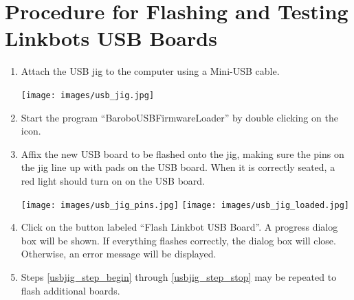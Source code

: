 \documentclass{article}
\begin{document}
\section{Procedure for Flashing and Testing Linkbots USB Boards}

\begin{enumerate}
\item Attach the USB jig to the computer using a Mini-USB cable.

   \begin{center}
   \texttt{[image: images/usb\_jig.jpg]}
   \end{center}

\item Start the program ``BaroboUSBFirmwareLoader'' by double clicking on the icon.

\item \label{usbjig_step_begin} Affix the new USB board to be flashed onto the jig, making sure the pins
on the jig line up with pads on the USB board. When it is correctly seated, a
red light should turn on on the USB board.

   \begin{center}
   \texttt{[image: images/usb\_jig\_pins.jpg]}
   \texttt{[image: images/usb\_jig\_loaded.jpg]}
   \end{center}

\item \label{usbjig_step_stop} Click on the button labeled ``Flash Linkbot USB Board''. A progress
dialog box will be shown. If everything flashes correctly, the dialog box will
close. Otherwise, an error message will be displayed.

\item Steps \ref{usbjig_step_begin} through \ref{usbjig_step_stop} may be repeated to flash additional boards.
\end{enumerate}
\end{document}
